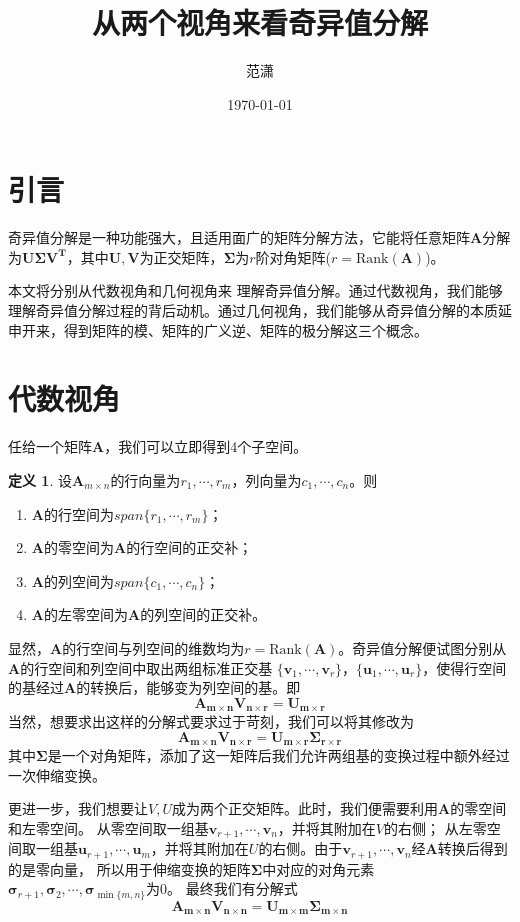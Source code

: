 \documentclass[12pt, a4paper, oneside]{ctexart}
\title{\textbf{从两个视角来看奇异值分解}}
\author{范潇\quad2254298}
\date{\today}
\theoremstyle{remark}
\theoremstyle{definition}
\theoremstyle{definition}
\newtheorem*{definition}{定义}
\theoremstyle{plain}
\begin{document}
\maketitle
\section{引言}
奇异值分解是一种功能强大，且适用面广的矩阵分解方法，它能将任意矩阵$\bm{A}$分解为$\bm{U\Sigma V^{T}}$，其中$\bm{U,V}$为正交矩阵，$\bm{\Sigma}$为$r$阶对角矩阵($r =\text{Rank}(\bm{A})$)。

本文将分别从代数视角和几何视角来
理解奇异值分解。通过代数视角，我们能够理解奇异值分解过程的背后动机。通过几何视角，我们能够从奇异值分解的本质延申开来，得到矩阵的模、矩阵的广义逆、矩阵的极分解这三个概念。
\section{代数视角}
任给一个矩阵$\bm{A}$，我们可以立即得到4个子空间。
\begin{definition}
    设$\bm{A}_{m\times n}$的行向量为$r_1,\cdots,r_m$，列向量为$c_1,\cdots,c_n$。则
    \begin{enumerate}
        \item $\bm{A}$的行空间为$span\{r_1,\cdots,r_m\}$；
        \item $\bm{A}$的零空间为$\bm{A}$的行空间的正交补；
        \item $\bm{A}$的列空间为$span\{c_1,\cdots,c_n\}$；
        \item $\bm{A}$的左零空间为$\bm{A}$的列空间的正交补。
    \end{enumerate}
\end{definition}

显然，$\bm{A}$的行空间与列空间的维数均为$r = \text{Rank}(\bm{A})$。奇异值分解便试图分别从$\bm{A}$的行空间和列空间中取出两组标准正交基
$\{\bm{v}_1,\cdots,\bm{v}_r\}$，$\{\bm{u}_1,\cdots,\bm{u}_r\}$，使得行空间的基经过$\bm{A}$的转换后，能够变为列空间的基。即
\[\bm{A_{m\times n}}\bm{V_{n\times r}}=\bm{U_{m\times r}}\]
当然，想要求出这样的分解式要求过于苛刻，我们可以将其修改为
\[\bm{A_{m\times n}}\bm{V_{n\times r}}=\bm{U_{m\times r}}\bm{\Sigma_{r\times r}}\]
其中$\bm{\Sigma}$是一个对角矩阵，添加了这一矩阵后我们允许两组基的变换过程中额外经过一次伸缩变换。

更进一步，我们想要让$V,U$成为两个正交矩阵。此时，我们便需要利用$\bm{A}$的零空间和左零空间。
从零空间取一组基$\bm{v}_{r+1},\cdots,\bm{v}_n$，并将其附加在$V$的右侧；
从左零空间取一组基$\bm{u}_{r+1},\cdots,\bm{u}_m$，并将其附加在$U$的右侧。由于$\bm{v}_{r+1},\cdots,\bm{v}_n$经$\bm{A}$转换后得到的是零向量，
所以用于伸缩变换的矩阵$\bm{\Sigma}$中对应的对角元素$\bm{\sigma}_{r+1},\bm{\sigma}_2,\cdots,\bm{\sigma}_{\min\{m,n\}}$为0。
最终我们有分解式
\[\bm{A_{m\times n}}\bm{V_{n\times n}}=\bm{U_{m\times m}}\bm{\Sigma_{m\times n}}\]
\end{document}
